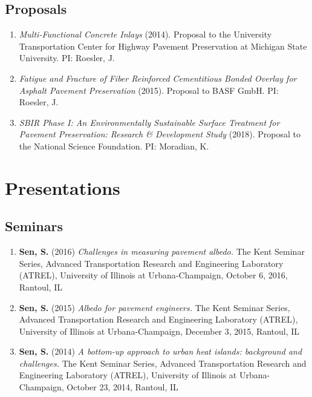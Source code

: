 \documentclass[12pt]{article}
\begin{document}
\subsection*{Proposals}
\begin{enumerate}[label=(P\arabic*)]
	\item \textit{Multi-Functional Concrete Inlays} (2014). Proposal to the University Transportation Center for Highway Pavement Preservation at Michigan State University. PI: Roesler, J. 
	\item \textit{Fatigue and Fracture of Fiber Reinforced Cementitious Bonded Overlay for Asphalt Pavement Preservation} (2015). Proposal to BASF GmbH. PI: Roesler, J. 
	\item \textit{SBIR Phase I: An Environmentally Sustainable Surface Treatment for Pavement Preservation: Research \& Development Study} (2018). Proposal to the National Science Foundation. PI: Moradian, K.
\end{enumerate}

\section*{Presentations}
\subsection*{Seminars}
\begin{enumerate}[label=(\arabic*)]
	\item \textbf{Sen, S.} (2016) \textit{Challenges in measuring pavement albedo.} The Kent Seminar Series, Advanced Transportation Research and Engineering Laboratory (ATREL), University of Illinois at Urbana-Champaign, October 6, 2016, Rantoul, IL
	\item \textbf{Sen, S.} (2015) \textit{Albedo for pavement engineers.} The Kent Seminar Series, Advanced Transportation Research and Engineering Laboratory (ATREL), University of Illinois at Urbana-Champaign, December 3, 2015, Rantoul, IL
	\item \textbf{Sen, S.} (2014) \textit{A bottom-up approach to urban heat islands: background and challenges.} The Kent Seminar Series, Advanced Transportation Research and Engineering Laboratory (ATREL), University of Illinois at Urbana-Champaign, October 23, 2014, Rantoul, IL
\end{enumerate}
\end{document}
